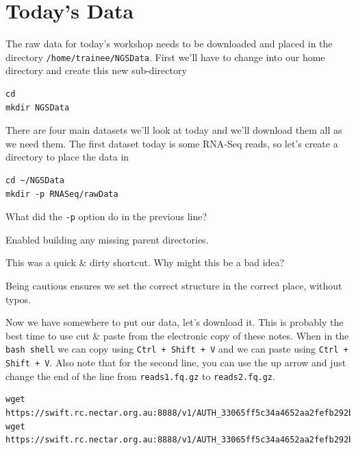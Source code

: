 \section{Today's Data}
\begin{steps}
The raw data for today's workshop needs to be downloaded and placed in the directory \texttt{/home/trainee/NGSData}.
First we'll have to change into our home directory and create this new sub-directory
\begin{lstlisting}
cd
mkdir NGSData
\end{lstlisting}

There are four main datasets we'll look at today and we'll download them all as we need them.
The first dataset today is some RNA-Seq reads, so let's create a directory to place the data in
\begin{lstlisting}
cd ~/NGSData
mkdir -p RNASeq/rawData
\end{lstlisting}
\end{steps}

\begin{questions}
What did the \texttt{-p} option do in the previous line?\\
\begin{answer}
Enabled building any missing parent directories.
\end{answer}
This was a quick \& dirty shortcut.
Why might this be a bad idea?\\
\begin{answer}
Being cautious ensures we set the correct structure in the correct place, without typos.\\
\end{answer}
\end{questions}

\begin{steps}
Now we have somewhere to put our data, let's download it.
This is probably the best time to use cut \& paste from the electronic copy of these notes.
When in the \texttt{bash shell} we can copy using \texttt{Ctrl + Shift + V} and we can paste using \texttt{Ctrl + Shift + V}.
Also note that for the second line, you can use the up arrow and just change the end of the line from \texttt{reads1.fq.gz} to \texttt{reads2.fq.gz}.

\begin{lstlisting}
wget https://swift.rc.nectar.org.au:8888/v1/AUTH_33065ff5c34a4652aa2fefb292b3195a/IntroNGS_2014/reads1.fq.gz
wget https://swift.rc.nectar.org.au:8888/v1/AUTH_33065ff5c34a4652aa2fefb292b3195a/IntroNGS_2014/reads2.fq.gz
\end{lstlisting}

\end{steps}

